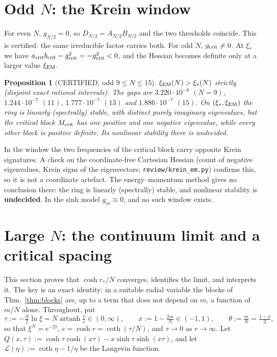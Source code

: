 \documentclass[11pt]{article}
\newtheorem{proposition}[theorem]{Proposition}
\theoremstyle{remark}
\begin{document}
\section{Odd $N$: the Krein window}\label{sec:krein}
For even $N$, $g_{N/2}=0$, so $D_{N/2}=A_{N/2}B_{N/2}$ and the two thresholds coincide. This is certified: the
same irreducible factor carries both. For odd $N$, $g_{\rm crit}\ne0$. At $\xi_*$ we have $a_{\rm crit}b_{\rm crit}-g_{\rm crit}^2=-g_{\rm crit}^2<0$, and
the Hessian becomes definite only at a larger value $\xi_{\rm EM}$.

\begin{proposition}[CERTIFIED, odd $9\le N\le15$]\label{prop:kreincert}
$\xi_{\rm EM}(N)>\xi_*(N)$ strictly (disjoint exact rational intervals). The gaps are
$3.220\cdot10^{-8}$ $(N=9)$, $1.244\cdot10^{-7}$ $(11)$, $1.777\cdot10^{-7}$ $(13)$ and $1.886\cdot10^{-7}$ $(15)$.
On $(\xi_*,\xi_{\rm EM})$ the ring is linearly (spectrally) stable, with distinct purely imaginary eigenvalues, but the
critical block $M_{\rm crit}$ has one positive and one negative eigenvalue, while every other block is positive
definite. Its nonlinear stability there is undecided.
\end{proposition}
In the window the two frequencies of the critical block carry opposite Krein signatures. A check on the
coordinate-free Cartesian Hessian (count of negative eigenvalues, Krein signs of the eigenvectors;
\texttt{review/krein\_em.py}) confirms this, so it is not a coordinate artefact. The energy--momentum method gives no conclusion there:
the ring is linearly (spectrally) stable, and nonlinear stability is \textbf{undecided}. In the sinh model $g_m\equiv0$, and no such window exists.

\section{Large $N$: the continuum limit and a critical spacing}\label{sec:asym}
This section proves that $\cosh r_*/N$ converges, identifies the limit, and interprets it. The key is an exact identity:
in a suitable radial variable the blocks of Thm.~\ref{thm:blocks} are, up to a term that does not depend on $m$, a function
of $m/N$ alone. Throughout, put
\[
\tau:=-\tfrac N2\ln\xi=N\operatorname{artanh}\tfrac1c\in(0,\infty),\qquad x:=1-\tfrac{2m}N\in(-1,1),\qquad
\theta:=\tfrac mN=\tfrac{1-x}2,
\]
so that $\xi^N=e^{-2\tau}$, $c=\cosh r=\coth(\tau/N)$, and $\tau\to0$ as $r\to\infty$. Let
$Q(x,\tau):=\cosh\tau\cosh(x\tau)-x\sinh\tau\sinh(x\tau)$, and let $\mathcal L(\eta):=\coth\eta-1/\eta$ be the Langevin
function.
\end{document}
